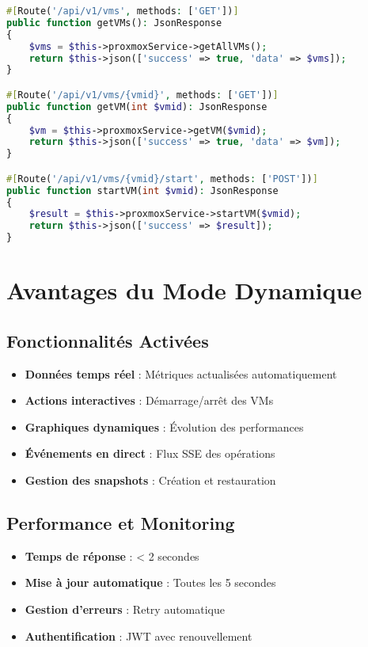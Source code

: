 \documentclass[12pt,a4paper]{report}
\begin{document}
\begin{lstlisting}[language=PHP, caption=Endpoints API backend]
#[Route('/api/v1/vms', methods: ['GET'])]
public function getVMs(): JsonResponse
{
    $vms = $this->proxmoxService->getAllVMs();
    return $this->json(['success' => true, 'data' => $vms]);
}

#[Route('/api/v1/vms/{vmid}', methods: ['GET'])]
public function getVM(int $vmid): JsonResponse
{
    $vm = $this->proxmoxService->getVM($vmid);
    return $this->json(['success' => true, 'data' => $vm]);
}

#[Route('/api/v1/vms/{vmid}/start', methods: ['POST'])]
public function startVM(int $vmid): JsonResponse
{
    $result = $this->proxmoxService->startVM($vmid);
    return $this->json(['success' => $result]);
}
\end{lstlisting}

\section{Avantages du Mode Dynamique}

\subsection{Fonctionnalités Activées}

\begin{itemize}
    \item \textbf{Données temps réel} : Métriques actualisées automatiquement
    \item \textbf{Actions interactives} : Démarrage/arrêt des VMs
    \item \textbf{Graphiques dynamiques} : Évolution des performances
    \item \textbf{Événements en direct} : Flux SSE des opérations
    \item \textbf{Gestion des snapshots} : Création et restauration
\end{itemize}

\subsection{Performance et Monitoring}

\begin{itemize}
    \item \textbf{Temps de réponse} : < 2 secondes
    \item \textbf{Mise à jour automatique} : Toutes les 5 secondes
    \item \textbf{Gestion d'erreurs} : Retry automatique
    \item \textbf{Authentification} : JWT avec renouvellement
\end{itemize}
\end{document}
